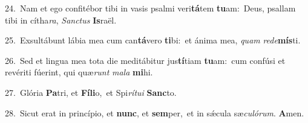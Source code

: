 {\numbfont\textcolor{\numbcolor}{24.}}~Nam et ego confitébor tibi in vasis psalmi veri\-\textbf{tá}\-tem \textbf{tu}\-am:~\star Deus, psallam tibi in cítha\-\textit{ra}\-, \textit{Sanc}\-\textit{tus} \textbf{Is}\-raël.\par
{\numbfont\textcolor{\numbcolor}{25.}}~Exsultábunt lábia mea cum can\-\textbf{tá}\-vero \textbf{ti}\-bi:~\star et ánima mea, \textit{quam} \textit{red}\-\textit{e}\textbf{mís}ti.\par
{\numbfont\textcolor{\numbcolor}{26.}}~Sed et lingua mea tota die meditábitur jus\-\textbf{tí}\-tiam \textbf{tu}\-am:~\star cum confúsi et revériti fúerint, qui quæ\textit{runt} \textit{ma}\-\textit{la} \textbf{mi}\-hi.\par
{\numbfont\textcolor{\numbcolor}{27.}}~Glória \textbf{Pa}\-tri, et \textbf{Fí}\-\textbf{li}o,~\star et Spi\-\textit{rí}\-\textit{tu}\textit{i} \textbf{Sanc}\-to.\par
{\numbfont\textcolor{\numbcolor}{28.}}~Sicut erat in princípio, et \textbf{nunc}\-, et \textbf{sem}\-per,~\star et in sǽcula sæ\-\textit{cu}\-\textit{ló}\textit{rum}. \textbf{A}\-men.\par
